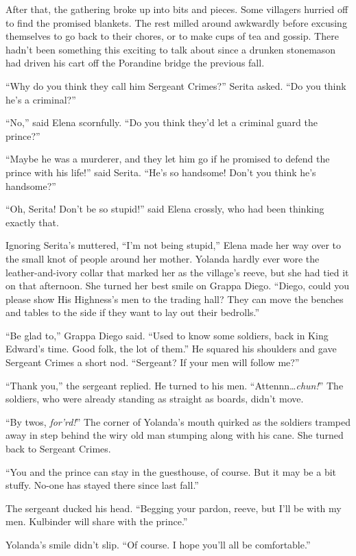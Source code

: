 \documentclass[10pt]{book}
\begin{document}
After that, the gathering broke up into bits and pieces. Some villagers hurried off to find the promised blankets. The rest milled around awkwardly before excusing themselves to go back to their chores, or to make cups of tea and gossip. There hadn't been something this exciting to talk about since a drunken stonemason had driven his cart off the Porandine bridge the previous fall.

``Why do you think they call him Sergeant Crimes?'' Serita asked. ``Do you think he's a criminal?''

``No,'' said Elena scornfully. ``Do you think they'd let a criminal guard the prince?''

``Maybe he was a murderer, and they let him go if he promised to defend the prince with his life!'' said Serita. ``He's so handsome! Don't you think he's handsome?''

``Oh, Serita! Don't be so stupid!'' said Elena crossly, who had been thinking exactly that.

Ignoring Serita's muttered, ``I'm not being stupid,'' Elena made her way over to the small knot of people around her mother. Yolanda hardly ever wore the leather-and-ivory collar that marked her as the village's reeve, but she had tied it on that afternoon. She turned her best smile on Grappa Diego. ``Diego, could you please show His Highness's men to the trading hall? They can move the benches and tables to the side if they want to lay out their bedrolls.''

``Be glad to,'' Grappa Diego said. ``Used to know some soldiers, back in King Edward's time. Good folk, the lot of them.'' He squared his shoulders and gave Sergeant Crimes a short nod. ``Sergeant? If your men will follow me?''

``Thank you,'' the sergeant replied. He turned to his men. ``Attennn{\ldots}\emph{chun!}'' The soldiers, who were already standing as straight as boards, didn't move.

``By twos, \emph{for'rd!}'' The corner of Yolanda's mouth quirked as the soldiers tramped away in step behind the wiry old man stumping along with his cane.  She turned back to Sergeant Crimes.

``You and the prince can stay in the guesthouse, of course. But it may be a bit stuffy. No-one has stayed there since last fall.''

The sergeant ducked his head. ``Begging your pardon, reeve, but I'll be with my men. Kulbinder will share with the prince.''

Yolanda's smile didn't slip. ``Of course. I hope you'll all be comfortable.''
\end{document}
